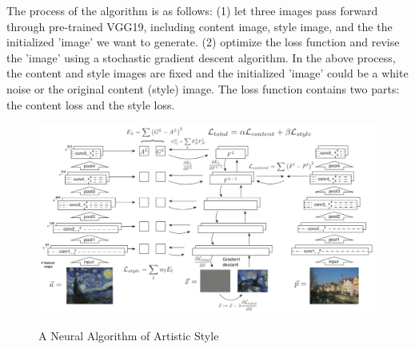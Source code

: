 \documentclass{article} %
\begin{document}
The process of the algorithm is as follows: (1) let three images pass forward through pre-trained VGG19, including content image, style image, and the the initialized 'image' we want to generate. (2) optimize the loss function and revise the 'image' using a stochastic gradient descent algorithm. In the above process, the content and style images are fixed and the initialized 'image' could be a white noise or the original content (style) image. The loss function contains two parts: the content loss and the style loss.
\begin{figure}[t]
\centering
\includegraphics[scale=0.35]{neuralstyletransfer.png}
\label{fig:naas}
\caption{A Neural Algorithm of Artistic Style}
\end{figure}
\end{document}
